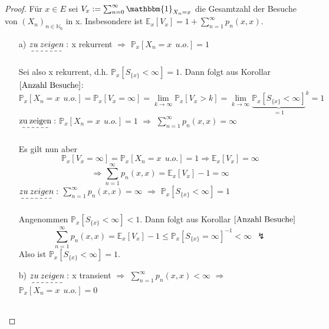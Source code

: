 \documentclass[a4paper,12pt]{scrartcl}
\theoremstyle{definition}
\begin{document}
\begin{proof}
Für $x \in E$ sei $V_{x} := \sum_{n=0}^{\infty} \mathbbm{1}_{X_{n} = x}$ die Gesamtzahl der Besuche von $(X_{n})_{n \in \mathbb{N}_{0}}$ in x. Insbesondere ist $\mathbb{E}_{x}[V_{x}] = 1 + \sum_{n=1}^{\infty} p_{n}(x,x)$.
\begin{itemize}
\item[a)] $\dashuline{zu \: zeigen}:$ x rekurrent $\Rightarrow$ $\mathbb{P}_{x}[X_{n} = x \: \: u.o.] = 1$
\\
\\
Sei also x rekurrent, d.h. $\mathbb{P}_{x}[S_{\lbrace x \rbrace} < \infty] = 1$. Dann folgt aus Korollar $\ref{Anzahl Besuche}$:
\begin{equation*}
\mathbb{P}_{x}[X_{n} = x \: \: u.o.] = \mathbb{P}_{x}[V_{x} = \infty] = \lim_{k \to \infty} \mathbb{P}_{x}[V_{x} > k] = \lim_{k \to \infty} {\underbrace{\mathbb{P}_{x}[S_{\lbrace x \rbrace} < \infty]}_{=1}}^{k} = 1 
\end{equation*}
$\mathrm{\dashuline{zu \: zeigen}:}$ $\mathbb{P}_{x}[X_{n} = x \: \: u.o.] = 1$ $\Rightarrow$ $\sum_{n=1}^{\infty} p_{n}(x,x) = \infty$
\\
\\
Es gilt nun aber
\begin{equation*}
\mathbb{P}_{x}[V_{x} = \infty] = \mathbb{P}_{x}[X_{n} = x \: \: u.o.] = 1 \Rightarrow \mathbb{E}_{x}[V_{x}] = \infty 
\end{equation*}
\begin{equation*}
\Rightarrow \sum_{n=1}^{\infty} p_{n}(x,x) = \mathbb{E}_{x}[V_{x}] - 1 = \infty
\end{equation*}
$\dashuline{zu \: zeigen}:$ $\sum_{n=1}^{\infty} p_{n}(x,x) = \infty$ $\Rightarrow$ $\mathbb{P}_{x}[S_{\lbrace x \rbrace} < \infty] = 1$ 
\\
\\
Angenommen $\mathbb{P}_{x}[S_{\lbrace x \rbrace} < \infty] < 1$. Dann folgt aus Korollar $\ref{Anzahl Besuche}$
\begin{equation*}
\sum_{n=1}^{\infty} p_{n}(x,x) = \mathbb{E}_{x}[V_{x}] - 1 \leq \mathbb{P}_{x}[S_{\lbrace x \rbrace} = \infty]^{-1} < \infty \: \: \lightning
\end{equation*}
Also ist $\mathbb{P}_{x}[S_{\lbrace x \rbrace} < \infty] = 1$.
\item[b)] $\dashuline{zu \: zeigen}:$ x transient $\Rightarrow$ $\sum_{n=1}^{\infty} p_{n}(x,x) < \infty$ $\Rightarrow$ $\mathbb{P}_{x}[X_{n} = x \: \: u.o.] = 0$
\\
\\

\end{itemize}
\end{proof}
\end{document}
